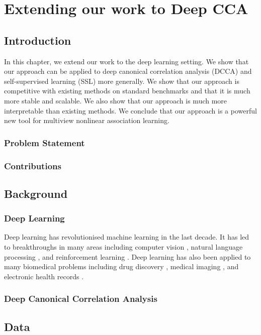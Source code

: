 \chapter{Extending our work to Deep CCA}
\minitoc
\section{Introduction}
In this chapter, we extend our work to the deep learning setting. We show that our approach can be applied to deep canonical correlation analysis (DCCA) and self-supervised learning (SSL) more generally. We show that our approach is competitive with existing methods on standard benchmarks and that it is much more stable and scalable. We also show that our approach is much more interpretable than existing methods. We conclude that our approach is a powerful new tool for multiview nonlinear association learning.

\subsection{Problem Statement}

\subsection{Contributions}


\section{Background}
\subsection{Deep Learning}
Deep learning has revolutionised machine learning in the last decade. It has led to breakthroughs in many areas including computer vision \cite{krizhevsky2012imagenet}, natural language processing \cite{devlin2018bert}, and reinforcement learning \cite{mnih2015human}. Deep learning has also been applied to many biomedical problems including drug discovery \cite{gawehn2016deep}, medical imaging \cite{litjens2017survey}, and electronic health records \cite{rajkomar2018scalable}.

\subsection{Deep Canonical Correlation Analysis}


\section{Data}

